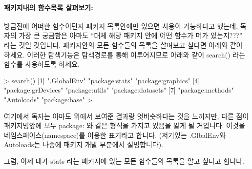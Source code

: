 \paragraph{패키지내의 함수목록 살펴보기: }
방금전에 어떠한 함수이던지 패키지 목록안에만 있으면 사용이 가능하다고 했는데, 독자의 가장 큰 궁금함은 아마도 ``대체 해당 패키지 안에 어떤 함수가 머가 있는지???'' 라는 것일 것입니다. 
패키지안의 모든 함수들의 목록을 살펴보고 싶다면 아래와 같이 하세요.
이러한 탐색기능은 탐색경로를 통해 이루어지므로 아래와 같이 search() 라는 함수를 사용하도록 하세요.

\begin{Schunk}
\begin{Soutput}
> search()
[1] ".GlobalEnv"        "package:stats"     "package:graphics" 
[4] "package:grDevices" "package:utils"     "package:datasets" 
[7] "package:methods"   "Autoloads"         "package:base"     
> 
\end{Soutput}
\end{Schunk}

여기에서 독자는 아마도 위에서 보여준 결과랑 엇비슷하다는 것을 느끼지만, 다른 점이 패키지명앞에 모두 package: 와 같은 형식을 가지고 있음을 알게 될 거입니다. 
이것을 네임스페이스(namespace)를 이용한 표기라고 합니다. 
(저기있는 .GlbalEnv와 Autoloads는 나중에 패키지 개발 부분에서 설명합니다).

그럼, 이제 내가 stats 라는 패키지에 있는 모든 함수들의 목록을 알고 싶다고 합니다. 

